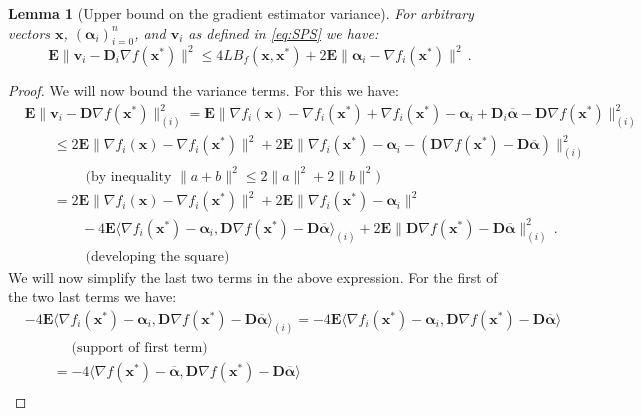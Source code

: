 \documentclass{article}
\newcommand{\Econd}{\mathbf{E}}
\def\xx{{\boldsymbol x}}
\def\vv{{\boldsymbol v}}
\def\DD{{\boldsymbol D}}
\newtheorem{lemma}{Lemma}
\begin{document}
\begin{lemma}[Upper bound on the gradient estimator variance]\label{lma:variance}
For arbitrary vectors $\xx$, $({\boldsymbol\alpha}_i)_{i=0}^n$, and $\vv_i$ as defined in \eqref{eq:SPS} we have:
\begin{equation}\label{eq:variance_terms}
    \Econd \|\vv_i - \DD_i \nabla f(\xx^*)\|^2  \leq 4 L B_f(\xx, \xx^*) + 2\Econd\|{\boldsymbol\alpha}_i - \nabla f_i(\xx^*) \|^2 \, .
\end{equation}

\end{lemma}
\begin{proof}
We will now bound the variance terms. For this we have:
\begin{align}
&\Econd\| \vv_i -  \DD \nabla f(\xx^*) \|_{(i)}^2 = \Econd\|\nabla f_i(\xx) - \nabla f_i(\xx^*)  + \nabla f_i(\xx^*) - {\boldsymbol\alpha}_i + \DD_i \overline{{\boldsymbol\alpha}} - \DD \nabla f(\xx^*)\|_{(i)}^2 \nonumber\\
&\qquad\leq 2 \Econd \|\nabla f_i(\xx) - \nabla f_i(\xx^*)\|^2 + 2 \Econd \|  \nabla f_i(\xx^*) - {\boldsymbol\alpha}_i - (\DD\nabla f(\xx^*) - \DD \overline{{\boldsymbol\alpha}} ) \|_{(i)}^2 \nonumber\\
&\qquad\qquad \text{ (by inequality $\|a + b\|^2 \leq 2 \|a\|^2 + 2 \|b\|^2$)}\nonumber\\
&\qquad= 2 \Econd \|\nabla f_i(\xx) - \nabla f_i(\xx^*)\|^2+ 2\Econd\|\nabla f_i(\xx^*) - {\boldsymbol\alpha}_i \|^2 \nonumber\\
&\qquad\qquad- 4 \Econd \langle \nabla f_i(\xx^*) - {\boldsymbol\alpha}_i, \DD \nabla f(\xx^*) - \DD \overline{{\boldsymbol\alpha}}  \rangle_{(i)} + 2\Econd \|\DD \nabla f(\xx^*) - \DD \overline{{\boldsymbol\alpha}} \|_{(i)}^2\,.\\
&\qquad\qquad \text{ (developing the square)}\nonumber
\end{align}
We will now simplify the last two terms in the above expression. For the first of the two last terms we have:
\begin{align}
  &- 4\Econd \langle \nabla f_i(\xx^*) - {\boldsymbol\alpha}_i, \DD \nabla f(\xx^*) - \DD \overline{{\boldsymbol\alpha}}  \rangle_{(i)} =- 4 \Econd \langle \nabla f_i(\xx^*) - {\boldsymbol\alpha}_i, \DD \nabla f(\xx^*) - \DD \overline{{\boldsymbol\alpha}}  \rangle\\
  &\qquad \quad \text{ (support of first term)} \nonumber\\
  &\qquad= - 4 \langle \nabla f(\xx^*) - \overline{{\boldsymbol\alpha}}, \DD\nabla f(\xx^*) - \DD\overline{{\boldsymbol\alpha}}  \rangle \nonumber\\

\end{align}
\end{proof}
\end{document}
